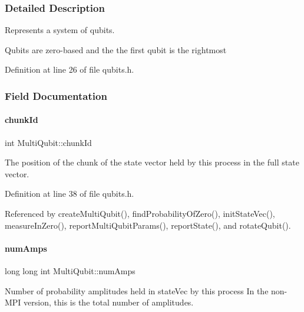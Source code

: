 \subsubsection{Detailed Description}
Represents a system of qubits. 

Qubits are zero-\/based and the the first qubit is the rightmost 

Definition at line 26 of file qubits.\+h.



\subsubsection{Field Documentation}
\mbox{\label{structMultiQubit_ab10c88249fa3825d6227ceec01d37e37}} 
\paragraph{\texorpdfstring{chunk\+Id}{chunkId}}
{\footnotesize\ttfamily int Multi\+Qubit\+::chunk\+Id}



The position of the chunk of the state vector held by this process in the full state vector. 



Definition at line 38 of file qubits.\+h.



Referenced by create\+Multi\+Qubit(), find\+Probability\+Of\+Zero(), init\+State\+Vec(), measure\+In\+Zero(), report\+Multi\+Qubit\+Params(), report\+State(), and rotate\+Qubit().

\mbox{\label{structMultiQubit_ae16f47d8b725c914fb7f66b6498d79db}} 
\paragraph{\texorpdfstring{num\+Amps}{numAmps}}
{\footnotesize\ttfamily long long int Multi\+Qubit\+::num\+Amps}



Number of probability amplitudes held in state\+Vec by this process In the non-\/\+M\+PI version, this is the total number of amplitudes. 



